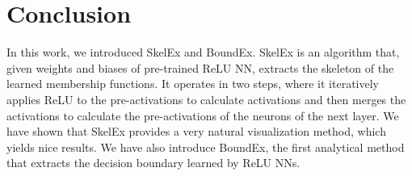 \documentclass{article}
\begin{document}
\section{Conclusion}
\label{sec:6}

In this work, we introduced SkelEx and BoundEx. SkelEx is an algorithm that, given weights and biases of pre-trained ReLU NN, extracts the skeleton of the learned membership functions. It operates in two steps, where it iteratively applies ReLU to the pre-activations to calculate activations and then merges the activations to calculate the pre-activations of the neurons of the next layer. We have shown that SkelEx provides a very natural visualization method, which yields nice results. We have also introduce BoundEx, the first analytical method that extracts the decision boundary learned by ReLU NNs.

%


\end{document}
